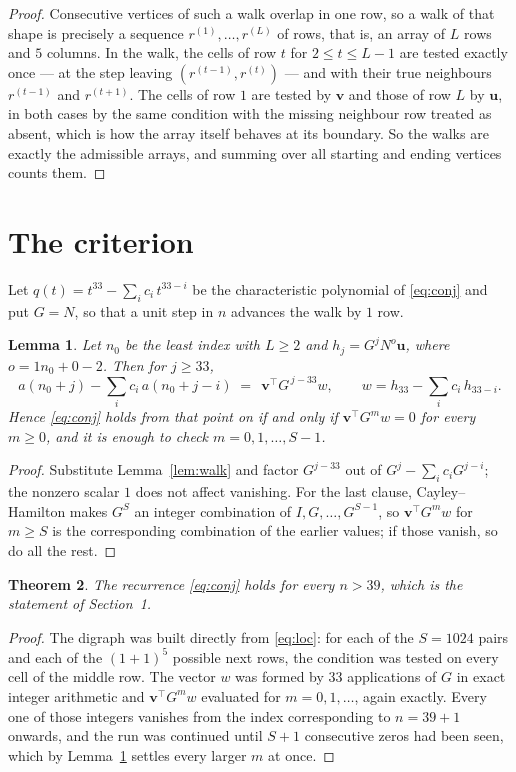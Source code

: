 \documentclass[11pt,a4paper]{article}
\theoremstyle{plain}
\newtheorem{theorem}{Theorem}
\newtheorem{lemma}[theorem]{Lemma}
\theoremstyle{definition}
\begin{document}
\begin{proof}
Consecutive vertices of such a walk overlap in one row, so a walk of that shape is
precisely a sequence $r^{(1)},\dots,r^{(L)}$ of rows, that is, an array of $L$ rows
and $5$ columns. In the walk, the cells of row $t$ for $2\le t\le L-1$ are tested
exactly once --- at the step leaving $(r^{(t-1)},r^{(t)})$ --- and with their true
neighbours $r^{(t-1)}$ and $r^{(t+1)}$. The cells of row $1$ are tested by
$\mathbf{v}$ and those of row $L$ by $\mathbf{u}$, in both cases by the same condition
with the missing neighbour row treated as absent, which is how the array itself behaves at
its boundary. So the walks are exactly the admissible arrays, and summing over all starting
and ending vertices counts them.
\end{proof}

\section{The criterion}

Let $q(t)=t^{33}-\sum_i c_i\,t^{33-i}$ be the characteristic polynomial of
\eqref{eq:conj} and put $G=N$, so that a unit step in $n$ advances the walk by
$1$ row.

\begin{lemma}\label{lem:crit}
Let $n_0$ be the least index with $L\ge2$ and $h_j=G^{j}N^{o}\mathbf{u}$, where
$o=1n_0+0-2$. Then for $j\ge33$,
\[
a(n_0+j)-\sum_i c_i\,a(n_0+j-i)\;=\;\,\mathbf{v}^{\!\top}G^{\,j-33}w,
\qquad w=h_{33}-\sum_i c_i\,h_{33-i} .
\]
Hence \eqref{eq:conj} holds from that point on if and only if
$\mathbf{v}^{\!\top}G^{m}w=0$ for every $m\ge0$, and it is enough to check
$m=0,1,\dots,S-1$.
\end{lemma}

\begin{proof}
Substitute Lemma~\ref{lem:walk} and factor $G^{j-33}$ out of
$G^{j}-\sum_ic_iG^{j-i}$; the nonzero scalar $1$ does not affect
vanishing. For the last clause, Cayley--Hamilton makes $G^{S}$ an integer combination of
$I,G,\dots,G^{S-1}$, so $\mathbf{v}^{\!\top}G^{m}w$ for $m\ge S$ is the corresponding
combination of the earlier values; if those vanish, so do all the rest.
\end{proof}

\begin{theorem}
The recurrence \eqref{eq:conj} holds for every $n>39$, which is the statement of
Section~1.
\end{theorem}

\begin{proof}
The digraph was built directly from \eqref{eq:loc}: for each of the $S=1024$ pairs and each
of the $(1+1)^{5}$ possible next rows, the condition was tested on every cell of
the middle row. The vector $w$ was formed by $33$ applications of $G$ in exact integer
arithmetic and $\mathbf{v}^{\!\top}G^{m}w$ evaluated for $m=0,1,\dots$, again exactly.
Every one of those integers vanishes from the index corresponding to $n=39+1$ onwards,
and the run was continued until $S+1$ consecutive zeros had been seen, which by
Lemma~\ref{lem:crit} settles every larger $m$ at once.
\end{proof}
\end{document}

